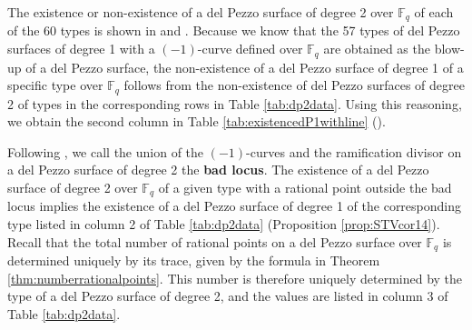 \documentclass[a4paper, 11pt, reqno]{amsart}
\numberwithin{equation}{section} \numberwithin{figure}{section}
\newcommand{\term}[1]{\textbf{#1}}          %
\def \F {{\mathbb F}}
\theoremstyle{definition}
\numberwithin{lemma}{section}
\begin{document}

The existence or non-existence of a del Pezzo surface of degree 2 over $\F_q$ of each of the 60 types is shown in \cite[Theorem 1.2]{trepalin} and \cite[Theorem 1.2]{LoughranTrepalin}. Because we know that the 57 types of del Pezzo surfaces of degree 1 with a $(-1)$-curve defined over $\F_q$ are obtained as the blow-up of a del Pezzo surface, the non-existence of a del Pezzo surface of degree 1 of a specific type over $\F_q$ follows from the non-existence of del Pezzo surfaces of degree 2 of types in the corresponding rows in Table \ref{tab:dp2data}. Using this reasoning, we obtain the second column in Table \ref{tab:existencedP1withline} (). 

Following \cite{BFL}, we call the union of the $(-1)$-curves and the ramification divisor on a del Pezzo surface of degree 2 the \term{bad locus}. The existence of a del Pezzo surface of degree 2 over $\F_q$ of a given type with a rational point outside the bad locus implies the existence of a del Pezzo surface of degree 1 of the corresponding type listed in column 2 of Table \ref{tab:dp2data} (Proposition \ref{prop:STVcor14}). Recall that the total number of rational points on a del Pezzo surface over $\F_q$ is determined uniquely by its trace, given by the formula in Theorem \ref{thm:numberrationalpoints}. This number is therefore uniquely determined by the type of a del Pezzo surface of degree 2, and the values are listed in column 3 of Table \ref{tab:dp2data}.
\end{document}
